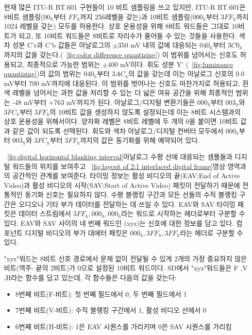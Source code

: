 현재 많은 ITU-R BT.601 구현들이 10 비트 샘플링을 쓰고 있지만, ITU-R BT.601은 8비트 샘플링($00_h$부터 $FF_h$까지 256레벨을 갖는)과 10비트 샘플링($000_h$부터 $3FF_h$까지 1024 레벨을 갖는) 모두를 허용한다.
상호 운용성을 위해 8비트 워드들은 그대로 10비트가 되고, 또 10비트 워드들은 8비트로 자리수가 줄어들 수 있는 것들을 사용한다. 색차 성분 C'r과 C'b 값들은 아날로그의 $\pm 350$ mV 내의 값에 대응되는 $040_h$부터 $3C0_h$까지의 값을 갖는다.(\figurename~\ref{fig:color difference quantizing})
이 범위를 넘어서는 신호도 허용되고, 최종적으로 가능한 범위는 $\pm 400$ mV이다. 휘도 성분 Y' (\figurename~\ref{fig:luminance quantizing})의 값의 범위는 $040_h$부터 $3AC_h$의 값을 갖는데 이는 아날로그 신호의 0.0 mV부터 700 mV까지에 대응된다.
이 범위를 벗어나는 신호도 마찬가지로 허용되고, 흰색 레벨을 넘어서는 과한 값을 처리할 수 있는 더 넓은 여유 공간을 위해 최종적인 범위는 -48 mV부터 +763 mV까지가 된다.
아날로그/디지털 변환기들은 $000_h$부터 $003_h$와 $3FC_h$부터 $3FF_h$의 10비트 값을 생성하지 않도록 설정되는데 이는 8비트 시스템과의 상호 운용성을 위해서이다.
양자화 레벨은 8비트 레벨에 두 개의 0을 붙이면 10비트 값과 같은 값이 되도록 선택된다. 휘도와 색차 아날로그/디지털 컨버터 모두에서 $000_h$부터 $003_h$와 $3FC_h$부터 $3FF_h$까지의 값은 동기화를 위해 예약되어 있다.


\figurename~\ref{fig:digital horizontal blanking interval}\은 아날로그 수평 선에 대응되는 샘플들과 디지털 워드들의 위치를 보여주고 \figurename~\ref{fig:layout of 2:1 interlaced digital frame}\은 영상 영역과의 공간적인 관계를 보여준다.
타이밍 정보는 활성 비디오의 끝(EAV;End of Active Video)과 활성 비디오의 시작(SAV;Start of Active Video) 패킷이 전달하기 때문에 전통적인 동기화 신호는 필요하지 않다.
수평 블랭킹 구간과 모든 선들의 수직 블랭킹 구간은 오디오나 기타 부가 데이터를 전달하는 데 쓰일 수 있다. EAV와 SAV 타이밍 패킷은 데이터 스트림에서 $3FF_h, 000_h, 000_h$라는 워드로 시작하는 헤더로부터 구분할 수 있다.
EAV와 SAV 사이의 네 번째 워드인 (xyz)는 신호에 대한 정보를 담고 있다. 컴포넌트 디지털 비디오의 부가 대에터 패킷은 $000_h, 3FF_h, 3FF_h$라는 헤더로 구분할 수 있다.

"xyz"워드는 8비트 신호 경로에서 문제 없이 전달될 수 있게 2개의 가장 중요하지 않은 비트(역주: 끝의 2비트)가 0으로 설정된 10비트 워드이다.
SD에서 "xyz"워드들은 F ,V ,H라는 함수를 담고 있는데, 각 함수들은 다음의 값을 갖는다:
\begin{itemize}
    \item 8번째 비트(F-비트): 첫 번째 필드에서 0, 두 번째 필드에서 1
    \item 7번째 비트(V-비트): 수직 블랭킹 구간에서 1, 활성 비디오 선에서 0
    \item 6번째 비트(H-비트): 1은 EAV 시퀀스를 가리키며 0은 SAV 시퀀스를 가리킴
\end{itemize}

